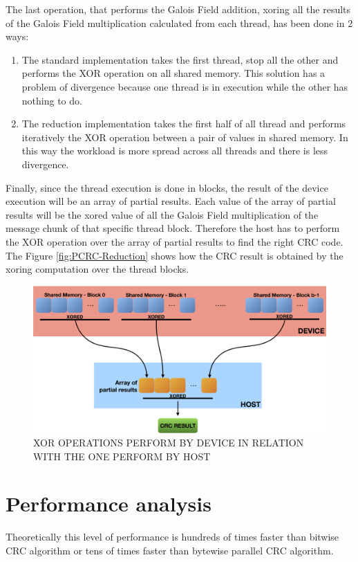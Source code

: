 \documentclass[fleqn]{IEEEtran}
\begin{document}
The last operation, that performs the Galois Field addition, xoring all the 
results of the Galois Field multiplication calculated from each thread, 
has been done in 2 ways:
\begin{enumerate}
   \item The standard implementation takes the first thread, stop all the 
   other and performs the XOR operation on all shared memory. This solution 
   has a problem of divergence because one thread is in execution while the 
   other has nothing to do.
   \item The reduction implementation takes the first half of all thread and 
   performs iteratively the XOR operation between a pair of values in shared 
   memory. In this way the workload is more spread across all threads and 
   there is less divergence.
\end{enumerate}

Finally, since the thread execution is done in blocks, the result of the 
device execution will be an array of partial results. Each value of the 
array of partial results will be the xored value of all the Galois Field 
multiplication of the message chunk of that specific thread block. 
Therefore the host has to perform the XOR operation over the array of partial 
results to find the right CRC code. The Figure \ref{fig:PCRC-Reduction} 
shows how the CRC result is obtained by the xoring computation over 
the thread blocks.

\begin{figure}[bt]
\centering
\includegraphics[width=\columnwidth]{figures/PCRC-reduction.png}
\caption{XOR OPERATIONS PERFORM BY DEVICE IN RELATION WITH THE ONE PERFORM BY HOST}
\label{fig:PCRC-reduction}
\end{figure}
\section{Performance analysis}
Theoretically this level of performance is hundreds of 
times faster than bitwise CRC algorithm or tens of times faster than 
bytewise parallel CRC algorithm.
\end{document}
